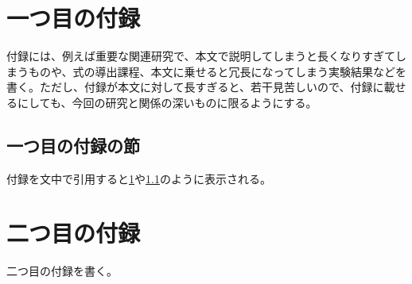 \chapter{一つ目の付録}
\label{chap:first-apdx}

付録には、例えば重要な関連研究で、本文で説明してしまうと長くなりすぎてしまうものや、式の導出課程、本文に乗せると冗長になってしまう実験結果などを書く。ただし、付録が本文に対して長すぎると、若干見苦しいので、付録に載せるにしても、今回の研究と関係の深いものに限るようにする。

\section{一つ目の付録の節}
\label{sec:first-sec-in-first-apdx}

付録を文中で引用すると\cref{chap:first-apdx}や\cref{sec:first-sec-in-first-apdx}のように表示される。

\chapter{二つ目の付録}
\label{chap:second-apdx}

二つ目の付録を書く。
